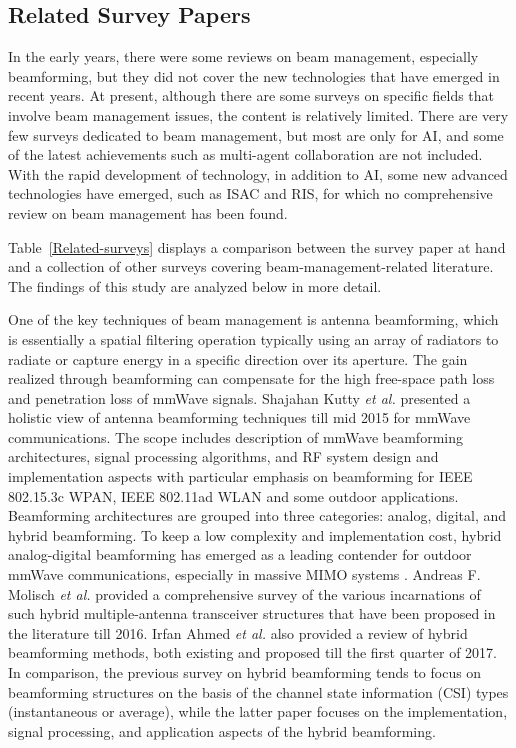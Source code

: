 \documentclass[journal,comsoc]{IEEEtran}
\begin{document}
\subsection{Related Survey Papers}
In the early years, there were some reviews on beam management, especially beamforming, but they did not cover the new technologies that have emerged in recent years. At present, although there are some surveys on specific fields that involve beam management issues, the content is relatively limited. There are very few surveys dedicated to beam management, but most are only for AI, and some of the latest achievements such as multi-agent collaboration are not included. With the rapid development of technology, in addition to AI, some new advanced technologies have emerged, such as ISAC and RIS, for which no comprehensive review on beam management has been found.

Table~\ref{Related-surveys} displays a comparison between the survey paper at hand and a collection of other surveys covering beam-management-related literature. The findings of this study are analyzed below in more detail.

One of the key techniques of beam management is antenna beamforming, which is essentially a spatial filtering operation typically using an array of radiators to radiate or capture energy in a specific direction over its aperture. The gain realized through beamforming can compensate for the high free-space path loss and penetration loss of mmWave signals. Shajahan Kutty \emph{et al.} \cite{Beamforming-Survey-2016} presented a holistic view of antenna beamforming techniques till mid 2015 for mmWave communications. The scope includes description of mmWave beamforming architectures, signal processing algorithms, and RF system design and implementation aspects with particular emphasis on beamforming for IEEE 802.15.3c WPAN, IEEE 802.11ad WLAN and some outdoor applications. Beamforming architectures are grouped into three categories: analog, digital, and hybrid beamforming. To keep a low complexity and implementation cost, hybrid analog-digital beamforming has emerged as a leading contender for outdoor mmWave communications, especially in massive MIMO systems \cite{CSI-Feedback-Massive-MIMO,Antenna-Selection}. Andreas F. Molisch \emph{et al.} \cite{Hybrid-Beamforming-Massive-MIMO-Survey-2017} provided a comprehensive survey of the various incarnations of such hybrid multiple-antenna transceiver structures that have been proposed in the literature till 2016. Irfan Ahmed \emph{et al.} \cite{Survey-Hybrid-Beamforming-2018} also provided a review of hybrid beamforming methods, both existing and proposed till the first quarter of 2017. In comparison, the previous survey on hybrid beamforming \cite{Hybrid-Beamforming-Massive-MIMO-Survey-2017} tends to focus on beamforming structures on the basis of the channel state information (CSI) types (instantaneous or average), while the latter paper \cite{Survey-Hybrid-Beamforming-2018} focuses on the implementation, signal processing, and application aspects of the hybrid beamforming.
\end{document}
